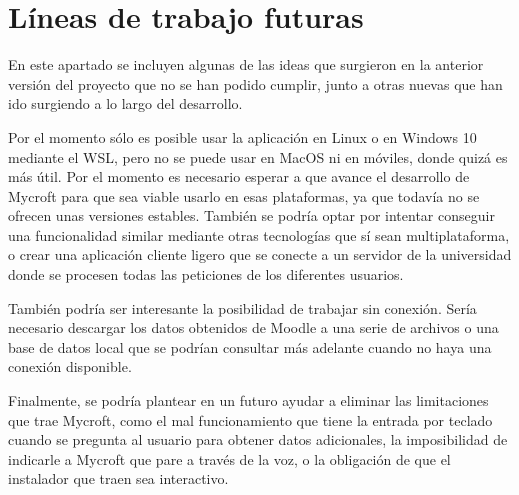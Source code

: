 \section{Líneas de trabajo futuras}
En este apartado se incluyen algunas de las ideas que surgieron en la anterior versión del proyecto que no se han podido cumplir, junto a otras  nuevas que han ido surgiendo a lo largo del desarrollo.

Por el momento sólo es posible usar la aplicación en Linux o en Windows 10 mediante el WSL, pero no se puede usar en MacOS ni en móviles, donde quizá es más útil. Por el momento es necesario esperar a que avance el desarrollo de Mycroft para que sea viable usarlo en esas plataformas, ya que todavía no se ofrecen unas versiones estables. También se podría optar por intentar conseguir una funcionalidad similar mediante otras tecnologías que sí sean multiplataforma, o crear una aplicación cliente ligero que se conecte a un servidor de la universidad donde se procesen todas las peticiones de los diferentes usuarios.

También podría ser interesante la posibilidad de trabajar sin conexión. Sería necesario descargar los datos obtenidos de Moodle a una serie de archivos o una base de datos local que se podrían consultar más adelante cuando no haya una conexión disponible.

Finalmente, se podría plantear en un futuro ayudar a eliminar las limitaciones que trae Mycroft, como el mal funcionamiento que tiene la entrada por teclado cuando se pregunta al usuario para obtener datos adicionales, la imposibilidad de indicarle a Mycroft que pare a través de la voz, o la obligación de que el instalador que traen sea interactivo.